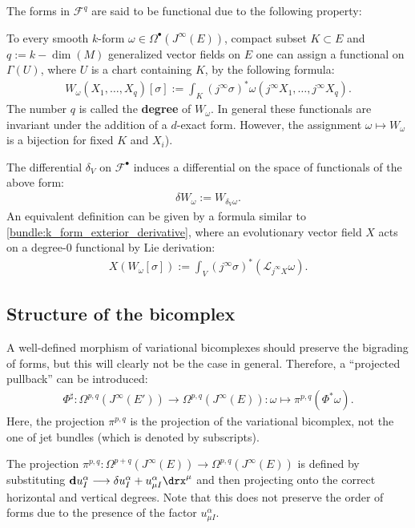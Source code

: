     The forms in $\mathcal{F}^q$ are said to be functional due to the following property:
    \begin{property}[Functionals]
        To every smooth $k$-form $\omega\in\Omega^\bullet(J^\infty(E))$, compact subset $K\subset E$ and $q:=k-\dim(M)$ generalized vector fields on $E$ one can assign a functional on $\Gamma(U)$, where $U$ is a chart containing $K$, by the following formula:
        \begin{gather}
            \label{var:functionals}
            W_\omega(X_1,\ldots,X_q)[\sigma] := \int_K(j^\infty\sigma)^*\omega(j^\infty X_1,\ldots,j^\infty X_q).
        \end{gather}
        The number $q$ is called the \textbf{degree} of $W_\omega$. In general these functionals are invariant under the addition of a $d$-exact form. However, the assignment $\omega\mapsto W_\omega$ is a bijection for fixed $K$ and $X_i$).
    \end{property}
    \begin{construct}
        The differential $\delta_V$ on $\mathcal{F}^\bullet$ induces a differential on the space of functionals of the above form:
        \begin{gather}
            \delta W_\omega := W_{\delta_V\omega}.
        \end{gather}
        An equivalent definition can be given by a formula similar to \eqref{bundle:k_form_exterior_derivative}, where an evolutionary vector field $X$ acts on a degree-$0$ functional by Lie derivation:
        \begin{gather}
            X(W_\omega[\sigma]) := \int_V(j^\infty\sigma)^*(\mathcal{L}_{j^\infty X}\omega).
        \end{gather}
    \end{construct}

\subsection{Structure of the bicomplex}

    A well-defined morphism of variational bicomplexes should preserve the bigrading of forms, but this will clearly not be the case in general. Therefore, a ``projected pullback'' can be introduced:
    \begin{gather}
        \Phi^\sharp:\Omega^{p,q}(J^\infty(E'))\rightarrow\Omega^{p,q}(J^\infty(E)):\omega\mapsto\pi^{p,q}(\Phi^*\omega).
    \end{gather}
    Here, the projection $\pi^{p,q}$ is the projection of the variational bicomplex, not the one of jet bundles (which is denoted by subscripts).
    \begin{remark}\label{var:degree_raise_remark}
        The projection $\pi^{p,q}:\Omega^{p+q}(J^\infty(E))\rightarrow\Omega^{p,q}(J^\infty(E))$ is defined by substituting $\mathbf{d}u^\alpha_I\longrightarrow\delta u^\alpha_I + u^\alpha_{\mu I}\drx^\mu$ and then projecting onto the correct horizontal and vertical degrees. Note that this does not preserve the order of forms due to the presence of the factor $u^\alpha_{\mu I}$.
    \end{remark}

